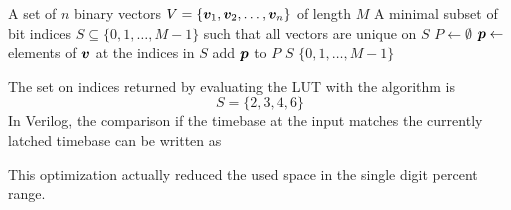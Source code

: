 \begin{algorithm}
	\caption{Extract the smallest subset of indices, to distinguish two time bases from the binary \acs{LUT} values in \autoref{tab:candidates}.}\label{alg:subset}
	\begin{algorithmic}[1]
		\Require A set of $n$ binary vectors $V = \{\bm{v}_1, \bm{v}_2, \dots, \bm{v}_n\}$ of length $M$
		\Ensure A minimal subset of bit indices $S \subseteq \{0,1,\dots,M-1\}$ such that all vectors are unique on $S$
		\State $P \gets \emptyset$
		\State $\bm{p} \gets $ elements of $\bm{v}$ at the indices in $S$
		\State add $\bm{p}$ to $P$
		\EndFor
		\State \Return $S$
		\EndIf
		\EndFor
		\EndFor
		\State \Return $\{0,1,\dots,M-1\}$ 
	\end{algorithmic}
\end{algorithm}

The set on indices returned by evaluating the \acs{LUT} with the algorithm is
\[
	S = \{2,3,4,6\}
\]
In Verilog, the comparison if the timebase at the input matches the currently latched timebase can be written as


This optimization actually reduced the used space in the single digit percent range.